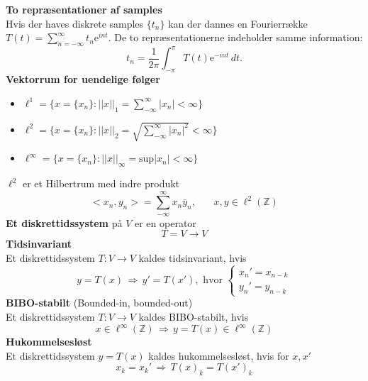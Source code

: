 \documentclass[12pt,a4paper,draft]{report}
\author{Frederik Appel Vardinghus-Nielsen}
\begin{document}
\noindent\textbf{To repræsentationer af samples}\\
Hvis der haves diskrete samples $\{t_n\}$ kan der dannes en Fourierrække $T(t)=\sum_{n=-\infty}^{\infty}t_n\mathrm{e}^{int}$. De to repræsentationerne indeholder samme information:
\begin{equation}
t_n=\frac{1}{2\pi}\int_{-\pi}^{\pi}\!T(t)\mathrm{e}^{-int}\,dt.
\end{equation}
\textbf{Vektorrum for uendelige følger}
\begin{itemize}
\item $\ell^1=\{x=\{x_n\}:||x||_1=\sum_{-\infty}^{\infty}|x_n|<\infty\}$
\item $\ell^2=\{x=\{x_n\}:||x||_2=\sqrt{\sum_{-\infty}^{\infty}|x_n|^2}<\infty\}$
\item $\ell^{\infty}=\{x=\{x_n\}:||x||_{\infty}=\mathrm{sup}|x_n|<\infty\}$
\end{itemize}
$\ell^2$ er et Hilbertrum med indre produkt
\begin{equation}
<x_n,y_n>=\sum_{-\infty}^{\infty}x_n\overline{y}_n,\phantom{mm}x,y\in\ell^2(\mathbb{Z})
\end{equation}
\textbf{Et diskrettidssystem} på $V$ er en operator
\begin{equation}
T=V\to V
\end{equation}
\textbf{Tidsinvariant}\\
Et diskrettidssystem $T:V\to V$ kaldes tidsinvariant, hvis
\begin{equation}
y=T(x)\,\Rightarrow\,y'=T(x'),\text{ hvor }\begin{cases}
x_n'=x_{n-k}\\
y_n'=y_{n-k}
\end{cases}
\end{equation}
\textbf{BIBO-stabilt} (Bounded-in, bounded-out)\\
Et diskrettidssystem $T:V\to V$ kaldes BIBO-stabilt, hvis
\begin{equation}
x\in\ell^{\infty}(\mathbb{Z})\,\Rightarrow\,y=T(x)\in\ell^{\infty}(\mathbb{Z})
\end{equation}
\textbf{Hukommelsesløst}\\
Et diskrettidssystem $y=T(x)$ kaldes		 hukommelsesløst, hvis for $x,x'$
\begin{equation}
x_k=x_k'\,\Rightarrow\,T(x)_k=T(x')_k
\end{equation}
\end{document}
